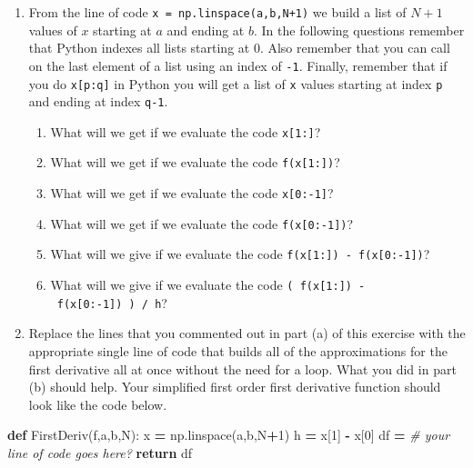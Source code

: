 \documentclass[
]{book}
\newenvironment{Shaded}{\begin{snugshade}}{\end{snugshade}}
\newcommand{\CommentTok}[1]{\textcolor[rgb]{0.56,0.35,0.01}{\textit{#1}}}
\newcommand{\ControlFlowTok}[1]{\textcolor[rgb]{0.13,0.29,0.53}{\textbf{#1}}}
\newcommand{\DecValTok}[1]{\textcolor[rgb]{0.00,0.00,0.81}{#1}}
\newcommand{\KeywordTok}[1]{\textcolor[rgb]{0.13,0.29,0.53}{\textbf{#1}}}
\newcommand{\NormalTok}[1]{#1}
\newcommand{\OperatorTok}[1]{\textcolor[rgb]{0.81,0.36,0.00}{\textbf{#1}}}
\providecommand{\tightlist}{%
  \setlength{\itemsep}{0pt}\setlength{\parskip}{0pt}}
\theoremstyle{definition}
\theoremstyle{definition}
\theoremstyle{definition}
\theoremstyle{remark}
\begin{document}
\begin{enumerate}
\def\labelenumi{\alph{enumi}.}
\setcounter{enumi}{1}
\tightlist
\item
  From the line of code \texttt{x\ =\ np.linspace(a,b,N+1)} we build a list of \(N+1\) values of \(x\) starting at \(a\) and ending at \(b\). In the following questions remember that Python indexes all lists starting at 0. Also remember that you can call on the last element of a list using an index of \texttt{-1}. Finally, remember that if you do \texttt{x{[}p:q{]}} in Python you will get a list of \texttt{x} values starting at index \texttt{p} and ending at index \texttt{q-1}.

  \begin{enumerate}
  \def\labelenumii{\roman{enumii}.}
  \tightlist
  \item
    What will we get if we evaluate the code \texttt{x{[}1:{]}}?
  \item
    What will we get if we evaluate the code \texttt{f(x{[}1:{]})}?
  \item
    What will we get if we evaluate the code \texttt{x{[}0:-1{]}}?\\
  \item
    What will we get if we evaluate the code \texttt{f(x{[}0:-1{]})}?
  \item
    What will we give if we evaluate the code \texttt{f(x{[}1:{]})\ -\ f(x{[}0:-1{]})}?
  \item
    What will we give if we evaluate the code \texttt{(\ f(x{[}1:{]})\ -\ f(x{[}0:-1{]})\ )\ /\ h}?
  \end{enumerate}
\item
  Replace the lines that you commented out in part (a) of this exercise with the appropriate single line of code that builds all of the approximations for the first derivative all at once without the need for a loop. What you did in part (b) should help. Your simplified first order first derivative function should look like the code below.
\end{enumerate}

\begin{Shaded}
\begin{Highlighting}[]
\KeywordTok{def}\NormalTok{ FirstDeriv(f,a,b,N):}
\NormalTok{    x }\OperatorTok{=}\NormalTok{ np.linspace(a,b,N}\OperatorTok{+}\DecValTok{1}\NormalTok{)}
\NormalTok{    h }\OperatorTok{=}\NormalTok{ x[}\DecValTok{1}\NormalTok{] }\OperatorTok{{-}}\NormalTok{ x[}\DecValTok{0}\NormalTok{]}
\NormalTok{    df }\OperatorTok{=} \CommentTok{\# your line of code goes here?  }
    \ControlFlowTok{return}\NormalTok{ df}
\end{Highlighting}
\end{Shaded}
\end{document}
